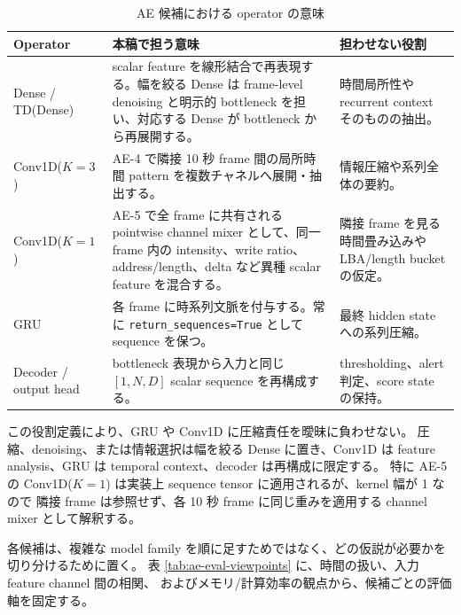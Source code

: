 \begin{table}[tb]
  \centering
  \caption{AE 候補における operator の意味}
  \label{tab:operator-roles}
  \begin{tabularx}{\linewidth}{lY Y}
    \toprule
    Operator & 本稿で担う意味 & 担わせない役割 \\
    \midrule
    Dense / TD(Dense) &
    scalar feature を線形結合で再表現する。幅を絞る Dense は frame-level denoising と明示的 bottleneck を担い、対応する Dense が bottleneck から再展開する。 &
    時間局所性や recurrent context そのものの抽出。 \\
    Conv1D($K=3$) &
    AE-4 で隣接 10 秒 frame 間の局所時間 pattern を複数チャネルへ展開・抽出する。 &
    情報圧縮や系列全体の要約。 \\
    Conv1D($K=1$) &
    AE-5 で全 frame に共有される pointwise channel mixer として、同一 frame 内の intensity、write ratio、address/length、delta など異種 scalar feature を混合する。 &
    隣接 frame を見る時間畳み込みや LBA/length bucket の仮定。 \\
    GRU &
    各 frame に時系列文脈を付与する。常に \texttt{return\_sequences=True} として sequence を保つ。 &
    最終 hidden state への系列圧縮。 \\
    Decoder / output head &
    bottleneck 表現から入力と同じ $[1,N,D]$ scalar sequence を再構成する。 &
    thresholding、alert 判定、score state の保持。 \\
    \bottomrule
  \end{tabularx}
\end{table}

この役割定義により、GRU や Conv1D に圧縮責任を曖昧に負わせない。
圧縮、denoising、または情報選択は幅を絞る Dense に置き、Conv1D は feature analysis、GRU は temporal
context、decoder は再構成に限定する。
特に AE-5 の Conv1D($K=1$) は実装上 sequence tensor に適用されるが、kernel 幅が 1 なので
隣接 frame は参照せず、各 10 秒 frame に同じ重みを適用する channel mixer として解釈する。

各候補は、複雑な model family を順に足すためではなく、どの仮説が必要かを切り分けるために置く。
表 \ref{tab:ae-eval-viewpoints} に、時間の扱い、入力 feature channel 間の相関、
およびメモリ/計算効率の観点から、候補ごとの評価軸を固定する。

